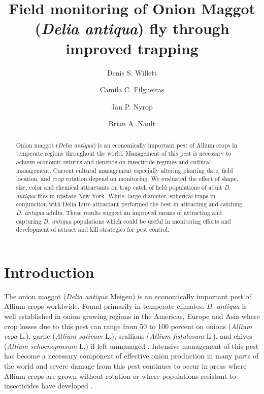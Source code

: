 \documentclass[alpha-refs]{wiley-article}
\title{Field monitoring of Onion Maggot (\textit{Delia antiqua}) fly through improved trapping}
\author[1\authfn{1}]{Denis S. Willett}
\author[1\authfn{1}]{Camila C. Filgueiras}
\author[1]{Jan P. Nyrop}
\author[1]{Brian A. Nault}
\affil[1]{Department of Entomology, Cornell AgriTech, Cornell University, Geneva, NY, 14456, USA}
\begin{document}
\maketitle

\begin{abstract}
Onion maggot (\textit{Delia antiqua}) is an economically important pest of Allium crops in temperate regions throughout the world.  Management of this pest is necessary to achieve economic returns and depends on insecticide regimes and cultural management.  Current cultural management especially altering planting date, field location, and crop rotation depend on monitoring.  We evaluated the effect of shape, size, color and chemical attractants on trap catch of field populations of adult \textit{D. antiqua} flies in upstate New York. White, large diameter, spherical traps in conjunction with Delia Lure attractant performed the best in attracting and catching \textit{D. antiqua} adults. These results suggest an improved means of attracting and capturing \textit{D. antiqua} populations which could be useful in monitoring efforts and development of attract and kill strategies for pest control. 

\end{abstract}

\linenumbers
\section{Introduction}

The onion maggot (\textit{Delia antiqua} Meigen) is an economically important pest of Allium crops worldwide.  Found primarily in temperate climates, \textit{D. antiqua} is well established in onion growing regions in the Americas, Europe and Asia where crop losses due to this pest can range from 50 to 100 percent on onions (\textit{Allium cepa} L.), garlic (\textit{Allium sativum} L.), scallions (\textit{Allium fistulosum} L.), and chives (\textit{Allium schoenoprasum} L.) if left unmanaged \citep{ellis1979factors,ning2017predicting,nault2007ecology, nault2006performance, nault2006onion}.  Intensive management of this pest has become a necessary component of effective onion production in many parts of the world and severe damage from this pest continues to occur in areas where Allium crops are grown without rotation or where populations resistant to insecticides have developed \citep{martinson1988dispersal, nault2006onion}.  
\end{document}
